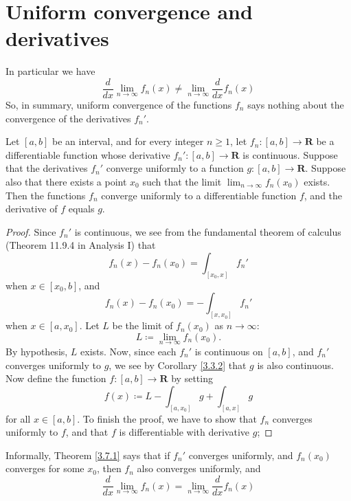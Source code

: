 \section{Uniform convergence and derivatives}\label{sec 3.7}

\begin{note}
    In particular we have
    \[
        \frac{d}{dx} \lim_{n \to \infty} f_n(x) \neq \lim_{n \to \infty} \frac{d}{dx} f_n(x)
    \]
    So, in summary, uniform convergence of the functions \(f_n\) says nothing about the convergence of the derivatives \(f_n'\).
\end{note}

\begin{theorem}\label{3.7.1}
    Let \([a, b]\) be an interval, and for every integer \(n \geq 1\), let \(f_n : [a, b] \to \mathbf{R}\) be a differentiable function whose derivative \(f_n' : [a, b] \to \mathbf{R}\) is continuous.
    Suppose that the derivatives \(f_n'\) converge uniformly to a function \(g : [a, b] \to \mathbf{R}\).
    Suppose also that there exists a point \(x_0\) such that the limit \(\lim_{n \to \infty} f_n(x_0)\) exists.
    Then the functions \(f_n\) converge uniformly to a differentiable function \(f\), and the derivative of \(f\) equals \(g\).
\end{theorem}

\begin{proof}
    Since \(f_n'\) is continuous, we see from the fundamental theorem of calculus (Theorem 11.9.4 in Analysis I) that
    \[
        f_n(x) - f_n(x_0) = \int_{[x_0, x]} f_n'
    \]
    when \(x \in [x_0, b]\), and
    \[
        f_n(x) - f_n(x_0) = -\int_{[x, x_0]} f_n'
    \]
    when \(x \in [a, x_0]\).
    Let \(L\) be the limit of \(f_n(x_0)\) as \(n \to \infty\):
    \[
        L \coloneqq \lim_{n \to \infty} f_n(x_0).
    \]
    By hypothesis, \(L\) exists.
    Now, since each \(f_n'\) is continuous on \([a, b]\), and \(f_n'\) converges uniformly to \(g\), we see by Corollary \ref{3.3.2} that \(g\) is also continuous.
    Now define the function \(f : [a, b] \to \mathbf{R}\) by setting
    \[
        f(x) \coloneqq L - \int_{[a, x_0]} g + \int_{[a, x]} g
    \]
    for all \(x \in [a, b]\).
    To finish the proof, we have to show that \(f_n\) converges uniformly to \(f\), and that \(f\) is differentiable with derivative \(g\);
\end{proof}

\begin{note}
    Informally, Theorem \ref{3.7.1} says that if \(f_n'\) converges uniformly, and \(f_n(x_0)\) converges for some \(x_0\), then \(f_n\) also converges uniformly, and
    \[
        \frac{d}{dx} \lim_{n \to \infty} f_n(x) = \lim_{n \to \infty} \frac{d}{dx} f_n(x)
    \]
\end{note}

